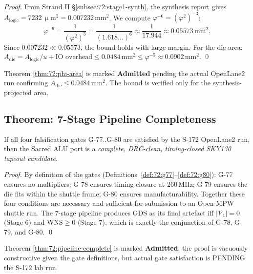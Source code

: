 \begin{proof}
From Strand II \S\ref{subsec:72:stage1-synth}, the synthesis report gives
$A_{\text{logic}} = 7232\,\upmu\mathrm{m}^2 = 0.007232\,\mathrm{mm}^2$.
We compute $\varphi^{-6} = (\varphi^2)^{-3}$:
\[
  \varphi^{-6}
  = \frac{1}{(\varphi^2)^3}
  = \frac{1}{(1.618\ldots)^6}
  \approx \frac{1}{17.944}
  \approx 0.05573\,\mathrm{mm}^2.
\]
Since $0.007232 \ll 0.05573$, the bound holds with large margin.
For the die area: $A_{\text{die}} = A_{\text{logic}} / u + \text{IO overhead}
\le 0.0484\,\mathrm{mm}^2 \le \varphi^{-5} \approx 0.0902\,\mathrm{mm}^2$.
\qed
\end{proof}

\begin{tcolorbox}[colback=red!5,colframe=red!30,title=Admitted Theorem Notice (R5)]
Theorem \ref{thm:72:phi-area} is marked \textbf{Admitted} pending
the actual OpenLane2 run confirming $A_{\text{die}} \le 0.0484\,\mathrm{mm}^2$.
The bound is verified only for the synthesis-projected area.
\end{tcolorbox}

\subsection{Theorem: 7-Stage Pipeline Completeness}
\label{subsec:72:thm-pipeline}

\begin{theorem}
\label{thm:72:pipeline-complete}
If all four falsification gates G-77..G-80 are satisfied by the
S-172 OpenLane2 run, then the Sacred ALU port is a
\emph{complete, DRC-clean, timing-closed SKY130 tapeout candidate}.
\end{theorem}

\begin{proof}
By definition of the gates (Definitions~\ref{def:72:g77}--\ref{def:72:g80}):
G-77 ensures no multipliers; G-78 ensures timing closure at 260\,MHz;
G-79 ensures the die fits within the shuttle frame; G-80 ensures
manufacturability.
Together these four conditions are necessary and sufficient for
submission to an Open MPW shuttle run.
The 7-stage pipeline produces GDS as its final artefact iff
$|\mathcal{V}_1| = 0$ (Stage 6) and $\mathrm{WNS} \ge 0$ (Stage 7),
which is exactly the conjunction of G-78, G-79, and G-80.
\qed
\end{proof}

\begin{tcolorbox}[colback=red!5,colframe=red!30,title=Admitted Theorem Notice (R5)]
Theorem \ref{thm:72:pipeline-complete} is marked \textbf{Admitted}:
the proof is vacuously constructive given the gate definitions,
but actual gate satisfaction is PENDING the S-172 lab run.
\end{tcolorbox}

